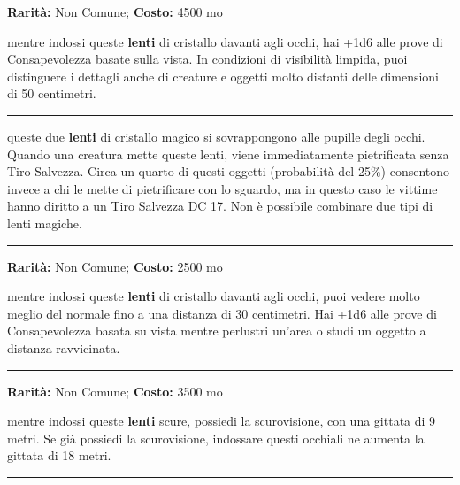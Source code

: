 \begin{multicols}{2}
\textbf{Rarità:} Non Comune; \textbf{Costo:} 4500 mo

mentre indossi queste \textbf{lenti} di cristallo davanti agli occhi, hai +1d6 alle prove di Consapevolezza basate sulla vista. In condizioni di visibilità limpida, puoi distinguere i dettagli anche di creature e oggetti molto distanti delle dimensioni di 50 centimetri.

\smallskip\noindent\rule{\linewidth}{2pt}  \hypertarget{Occhidellapietrificazione}{}\smallskip{}\noindent\label{Occhidellapietrificazione}

queste due \textbf{lenti} di cristallo magico si sovrappongono alle pupille degli occhi. Quando una creatura mette queste lenti, viene immediatamente pietrificata senza Tiro Salvezza. Circa un quarto di questi oggetti (probabilità del 25\%) consentono invece a chi le mette di pietrificare con lo sguardo, ma in questo caso le vittime hanno diritto a un Tiro Salvezza DC 17. Non è possibile combinare due tipi di lenti magiche.

\smallskip\noindent\rule{\linewidth}{2pt}  \hypertarget{OcchidellaVistaDettagliata}{}\smallskip{}\noindent\label{OcchidellaVistaDettagliata}

\textbf{Rarità:} Non Comune; \textbf{Costo:} 2500 mo

mentre indossi queste \textbf{lenti} di cristallo davanti agli occhi, puoi vedere molto meglio del normale fino a una distanza di 30 centimetri. Hai +1d6 alle prove di Consapevolezza basata su vista mentre perlustri un'area o studi un oggetto a distanza ravvicinata.

\smallskip\noindent\rule{\linewidth}{2pt}  \hypertarget{OcchialidaNotte}{}\smallskip{}\noindent\label{OcchialidaNotte}

\textbf{Rarità:} Non Comune; \textbf{Costo:} 3500 mo

mentre indossi queste \textbf{lenti} scure, possiedi la scurovisione, con una gittata di 9 metri. Se già possiedi la scurovisione, indossare questi occhiali ne aumenta la gittata di 18 metri.

\smallskip\noindent\rule{\linewidth}{2pt}  \hypertarget{OliodiAffilatezza}{}\smallskip{}\noindent\label{OliodiAffilatezza}


\end{multicols}
